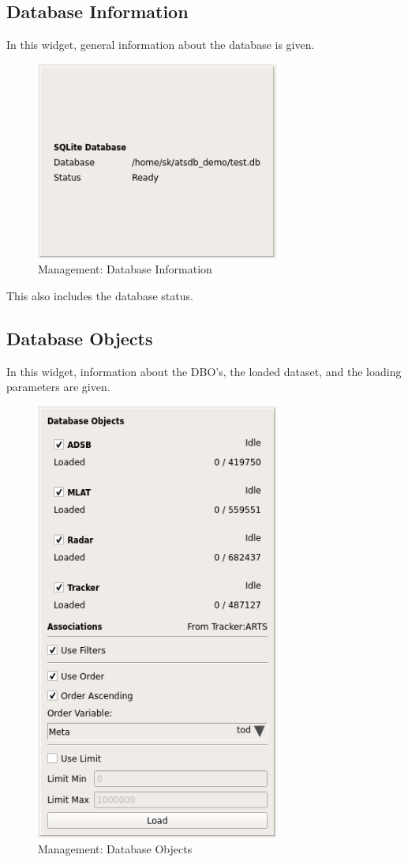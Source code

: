 \subsection{Database Information}

In this widget, general information about the database is given. 

\begin{figure}[H]
  \center
    \includegraphics[width=8cm,frame]{../screenshots/management_database.png}
  \caption{Management: Database Information}
  \label{fig:management_database}
\end{figure}

This also includes the database status.

\subsection{Database Objects}
\label{sec:management_dbos}

In this widget, information about the DBO's, the loaded dataset, and the loading parameters are given.

\begin{figure}[H]
  \center
    \includegraphics[width=8cm,frame]{../screenshots/management_dbos.png}
  \caption{Management: Database Objects}
  \label{fig:management_objects}
\end{figure}

